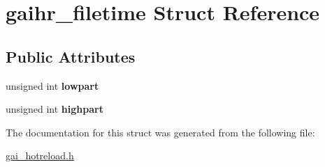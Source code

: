 \hypertarget{structgaihr__filetime}{}\section{gaihr\+\_\+filetime Struct Reference}
\label{structgaihr__filetime}
\subsection*{Public Attributes}
\begin{DoxyCompactItemize}
\item 
\mbox{\label{structgaihr__filetime_ac97443b53714d1ed266459ef0158c278}} 
unsigned int {\bfseries lowpart}
\item 
\mbox{\label{structgaihr__filetime_aa35cb3a699771f27e62ecff738665169}} 
unsigned int {\bfseries highpart}
\end{DoxyCompactItemize}


The documentation for this struct was generated from the following file\+:\begin{DoxyCompactItemize}
\item 
\hyperlink{gai__hotreload_8h}{gai\+\_\+hotreload.\+h}\end{DoxyCompactItemize}
